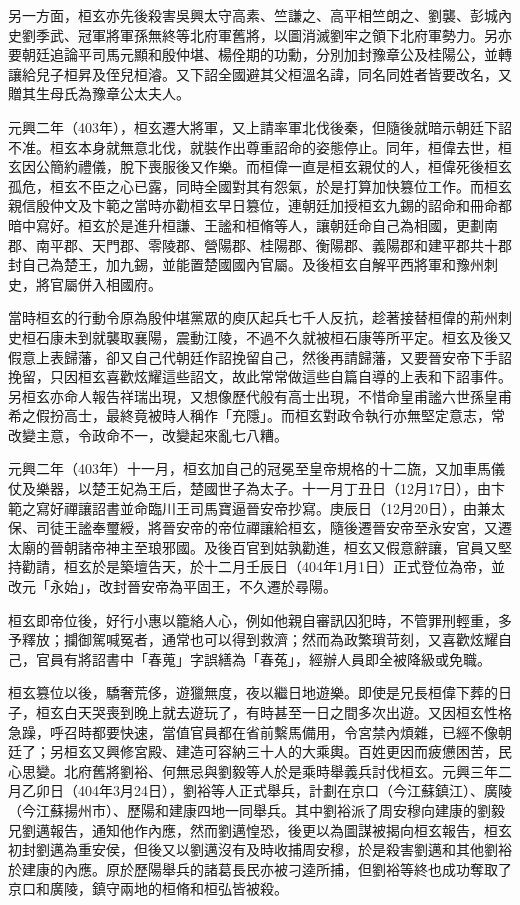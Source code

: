 另一方面，桓玄亦先後殺害吳興太守高素、竺謙之、高平相竺朗之、劉襲、彭城內史劉季武、冠軍將軍孫無終等北府軍舊將，以圖消滅劉牢之領下北府軍勢力。另亦要朝廷追論平司馬元顯和殷仲堪、楊佺期的功勳，分別加封豫章公及桂陽公，並轉讓給兒子桓昇及侄兒桓濬。又下詔全國避其父桓溫名諱，同名同姓者皆要改名，又贈其生母氏為豫章公太夫人。

元興二年（403年），桓玄遷大將軍，又上請率軍北伐後秦，但隨後就暗示朝廷下詔不准。桓玄本身就無意北伐，就裝作出尊重詔命的姿態停止。同年，桓偉去世，桓玄因公簡約禮儀，脫下喪服後又作樂。而桓偉一直是桓玄親仗的人，桓偉死後桓玄孤危，桓玄不臣之心已露，同時全國對其有怨氣，於是打算加快篡位工作。而桓玄親信殷仲文及卞範之當時亦勸桓玄早日篡位，連朝廷加授桓玄九錫的詔命和冊命都暗中寫好。桓玄於是進升桓謙、王謐和桓脩等人，讓朝廷命自己為相國，更劃南郡、南平郡、天門郡、零陵郡、營陽郡、桂陽郡、衡陽郡、義陽郡和建平郡共十郡封自己為楚王，加九錫，並能置楚國國內官屬。及後桓玄自解平西將軍和豫州刺史，將官屬併入相國府。

當時桓玄的行動令原為殷仲堪黨眾的庾仄起兵七千人反抗，趁著接替桓偉的荊州刺史桓石康未到就襲取襄陽，震動江陵，不過不久就被桓石康等所平定。桓玄及後又假意上表歸藩，卻又自己代朝廷作詔挽留自己，然後再請歸藩，又要晉安帝下手詔挽留，只因桓玄喜歡炫耀這些詔文，故此常常做這些自篇自導的上表和下詔事件。另桓玄亦命人報告祥瑞出現，又想像歷代般有高士出現，不惜命皇甫謐六世孫皇甫希之假扮高士，最終竟被時人稱作「充隱」。而桓玄對政令執行亦無堅定意志，常改變主意，令政命不一，改變起來亂七八糟。

元興二年（403年）十一月，桓玄加自己的冠冕至皇帝規格的十二旒，又加車馬儀仗及樂器，以楚王妃為王后，楚國世子為太子。十一月丁丑日（12月17日），由卞範之寫好禪讓詔書並命臨川王司馬寶逼晉安帝抄寫。庚辰日（12月20日），由兼太保、司徒王謐奉璽綬，將晉安帝的帝位禪讓給桓玄，隨後遷晉安帝至永安宮，又遷太廟的晉朝諸帝神主至琅邪國。及後百官到姑孰勸進，桓玄又假意辭讓，官員又堅持勸請，桓玄於是築壇告天，於十二月壬辰日（404年1月1日）正式登位為帝，並改元「永始」，改封晉安帝為平固王，不久遷於尋陽。

桓玄即帝位後，好行小惠以籠絡人心，例如他親自審訊囚犯時，不管罪刑輕重，多予釋放；攔御駕喊冤者，通常也可以得到救濟；然而為政繁瑣苛刻，又喜歡炫耀自己，官員有將詔書中「春蒐」字誤繕為「春菟」，經辦人員即全被降級或免職。

桓玄篡位以後，驕奢荒侈，遊獵無度，夜以繼日地遊樂。即使是兄長桓偉下葬的日子，桓玄白天哭喪到晚上就去遊玩了，有時甚至一日之間多次出遊。又因桓玄性格急躁，呼召時都要快速，當值官員都在省前繫馬備用，令宮禁內煩雜，已經不像朝廷了；另桓玄又興修宮殿、建造可容納三十人的大乘輿。百姓更因而疲憊困苦，民心思變。北府舊將劉裕、何無忌與劉毅等人於是乘時舉義兵討伐桓玄。元興三年二月乙卯日（404年3月24日），劉裕等人正式舉兵，計劃在京口（今江蘇鎮江）、廣陵（今江蘇揚州市）、歷陽和建康四地一同舉兵。其中劉裕派了周安穆向建康的劉毅兄劉邁報告，通知他作內應，然而劉邁惶恐，後更以為圖謀被揭向桓玄報告，桓玄初封劉邁為重安侯，但後又以劉邁沒有及時收捕周安穆，於是殺害劉邁和其他劉裕於建康的內應。原於歷陽舉兵的諸葛長民亦被刁逵所捕，但劉裕等終也成功奪取了京口和廣陵，鎮守兩地的桓脩和桓弘皆被殺。

